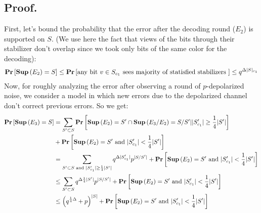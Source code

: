 \documentclass[manuscript,screen,review]{acmart}
\begin{document}
\subsection{Proof.}
First, let's bound the probability that the error after the decoding round ($E_{2}$) is supported on $S$. (We use here the fact that views of the bits through their stabilizer don't overlap since we took only bits of the same color for the decoding):
\begin{equation*}
  \begin{split}
    \mathbf{Pr} \left[  \mathbf{Sup}{} \left(E_{2}\right) = S  \right] \le \mathbf{Pr} \left[ \text{any bit } v\in S_{c_{1}} \text{ sees majority of statisfied stabilizers   }  \right] \le q^{\Delta |S|_{c_{1}}}
  \end{split}
\end{equation*}
Now, for roughly analyzing the error after observing a round of $p$-depolarized noise, we consider a model in which new errors due to the depolarized channel don't correct previous errors. So we get:
\begin{equation*}
  \begin{split}
    \mathbf{Pr} \left[  \mathbf{Sup}{} \left(E_{3}\right) = S    \right] &= \sum_{S^{\prime} \subset S}\mathbf{Pr} \left[   \mathbf{Sup}{} \left( E_{2} \right) = S^{\prime}  \cap \mathbf{Sup}{} \left( E_{3}/E_{2}\right) = S/S^{\prime} |  |S^{\prime}_{c_1}| \ge \frac{1}{4} |S^{\prime}|   \right]\\ 
    & + \mathbf{Pr} \left[  \mathbf{Sup}{} \left( E_{2} \right) = S^{\prime} \text{ and } |S^{\prime}_{c_1}| < \frac{1}{4} |S^{\prime}| \right] \\
    & = \sum_{S^{\prime} \subset S \text{ and }  |S^{\prime}_{c_1}| \ge \frac{1}{4} |S^{\prime}|}{q^{\Delta |S^{\prime}_{c_1}|}p^{|S /S^{\prime}|} } +  \mathbf{Pr} \left[  \mathbf{Sup}{} \left( E_{2} \right) = S^{\prime} \text{ and } |S^{\prime}_{c_1}| < \frac{1}{4} |S^{\prime}| \right] \\
    & \le \sum_{S^{\prime} \subset S }{q^{\Delta \frac{1}{4}|S^{\prime}|}p^{|S /S^{\prime}|}  } + \mathbf{Pr} \left[  \mathbf{Sup}{} \left( E_{2} \right) = S^{\prime} \text{ and } |S^{\prime}_{c_1}| < \frac{1}{4} |S^{\prime}| \right] \\
    &\le \left( q^{\frac{1}{4}\Delta} + p \right)^{|S|}  + \mathbf{Pr} \left[  \mathbf{Sup}{} \left( E_{2} \right) = S^{\prime} \text{ and } |S^{\prime}_{c_1}| < \frac{1}{4} |S^{\prime}| \right] 
  \end{split}
\end{equation*}
\end{document}

